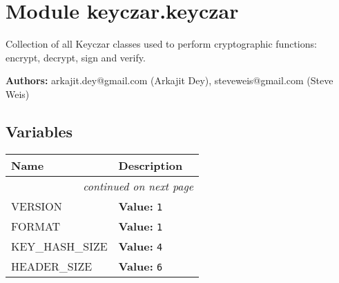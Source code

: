 %
%
%


\section{Module keyczar.keyczar}

    \label{keyczar:keyczar}
Collection of all Keyczar classes used to perform cryptographic functions: 
encrypt, decrypt, sign and verify.

\textbf{Authors:}
arkajit.dey@gmail.com (Arkajit Dey),
    steveweis@gmail.com (Steve Weis)



  \subsection{Variables}

    \vspace{-1cm}
\hspace{\varindent}\begin{longtable}{|p{\varnamewidth}|p{\vardescrwidth}|l}
\cline{1-2}
\cline{1-2} \centering \textbf{Name} & \centering \textbf{Description}& \\
\cline{1-2}
\endhead\cline{1-2}\multicolumn{3}{r}{\small\textit{continued on next page}}\\\endfoot\cline{1-2}
\endlastfoot\raggedright V\-E\-R\-S\-I\-O\-N\- & \raggedright \textbf{Value:} 
{\tt 1}&\\
\cline{1-2}
\raggedright F\-O\-R\-M\-A\-T\- & \raggedright \textbf{Value:} 
{\tt 1}&\\
\cline{1-2}
\raggedright K\-E\-Y\-\_\-H\-A\-S\-H\-\_\-S\-I\-Z\-E\- & \raggedright \textbf{Value:} 
{\tt 4}&\\
\cline{1-2}
\raggedright H\-E\-A\-D\-E\-R\-\_\-S\-I\-Z\-E\- & \raggedright \textbf{Value:} 
{\tt 6}&\\
\cline{1-2}
\end{longtable}


